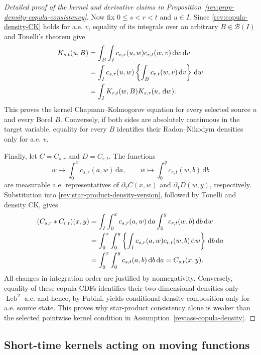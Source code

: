 \documentclass[11pt]{article}
\theoremstyle{remark}
\newcommand{\dd}{\,\mathrm d}
\newcommand{\Leb}{\operatorname{Leb}}
\begin{document}
\begin{proof}[Detailed proof of the kernel and derivative claims in
Proposition~\ref{rev:prop-density-copula-consistency}]
Now fix $0\le s<r<t$ and $u\in I$.  Since
\eqref{rev:copula-density-CK} holds for a.e. $v$, equality of its integrals over
an arbitrary $B\in\mathcal B(I)$ and Tonelli's theorem give
\begin{align}
K_{s,t}(u,B)
&=\int_B\int_Ic_{s,r}(u,w)c_{r,t}(w,v)\dd w\dd v\notag\\
&=\int_Ic_{s,r}(u,w)
       \left\{\int_Bc_{r,t}(w,v)\dd v\right\}\dd w\notag\\
&=\int_IK_{r,t}(w,B)K_{s,r}(u,\dd w).
\label{rev:app-density-to-kernel-CK}
\end{align}
This proves the kernel Chapman--Kolmogorov equation for every selected source
$u$ and every Borel $B$.  Conversely, if both sides are absolutely continuous
in the target variable, equality for every $B$ identifies their
Radon--Nikodym densities only for a.e. $v$.

Finally, let $C=C_{s,r}$ and $D=C_{r,t}$.  The functions
\[
w\longmapsto\int_0^xc_{s,r}(a,w)\dd a,
\qquad
w\longmapsto\int_0^yc_{r,t}(w,b)\dd b
\]
are measurable a.e. representatives of $\partial_2C(x,w)$ and
$\partial_1D(w,y)$, respectively.  Substitution into
\eqref{rev:star-product-density-version}, followed by Tonelli and density CK,
gives
\begin{align}
(C_{s,r}*C_{r,t})(x,y)
&=\int_I\int_0^xc_{s,r}(a,w)\dd a
             \int_0^yc_{r,t}(w,b)\dd b\dd w\notag\\
&=\int_0^x\int_0^y
     \left\{\int_Ic_{s,r}(a,w)c_{r,t}(w,b)\dd w\right\}\dd b\dd a\notag\\
&=\int_0^x\int_0^yc_{s,t}(a,b)\dd b\dd a
=C_{s,t}(x,y).
\label{rev:app-star-product-integral}
\end{align}
All changes in integration order are justified by nonnegativity.  Conversely,
equality of these copula CDFs identifies their two-dimensional densities only
$\Leb^2$-a.e. and hence, by Fubini, yields conditional density composition only
for a.e. source state.  This proves why star-product consistency alone is weaker
than the selected pointwise kernel condition in
Assumption~\ref{rev:ass-copula-density}.
\end{proof}

\subsection{Short-time kernels acting on moving functions}
\end{document}
